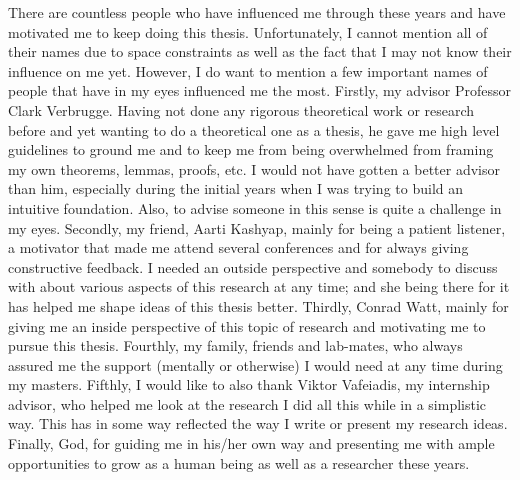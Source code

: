 There are countless people who have influenced me through these years and have motivated me to keep doing this thesis.
Unfortunately, I cannot mention all of their names due to space constraints as well as the fact that I may not know their influence on me yet.
However, I do want to mention a few important names of people that have in my eyes influenced me the most. 
Firstly, my advisor Professor Clark Verbrugge.
Having not done any rigorous theoretical work or research before and yet wanting to do a theoretical one as a thesis, he gave me high level guidelines to ground me and to keep me from being overwhelmed from framing my own theorems, lemmas, proofs, etc. 
I would not have gotten a better advisor than him, especially during the initial years when I was trying to build an intuitive foundation. 
Also, to advise someone in this sense is quite a challenge in my eyes.
Secondly, my friend, Aarti Kashyap, mainly for being a patient listener, a motivator that made me attend several conferences and for always giving constructive feedback. 
I needed an outside perspective and somebody to discuss with about various aspects of this research at any time; and she being there for it has helped me shape ideas of this thesis better. 
Thirdly, Conrad Watt, mainly for giving me an inside perspective of this topic of research and motivating me to pursue this thesis. 
Fourthly, my family, friends and lab-mates, who always assured me the support (mentally or otherwise) I would need at any time during my masters. 
Fifthly, I would like to also thank Viktor Vafeiadis, my internship advisor, who helped me look at the research I did all this while in a simplistic way.
This has in some way reflected the way I write or present my research ideas.
Finally, God, for guiding me in his/her own way and presenting me with ample opportunities to grow as a human being as well as a researcher these years.